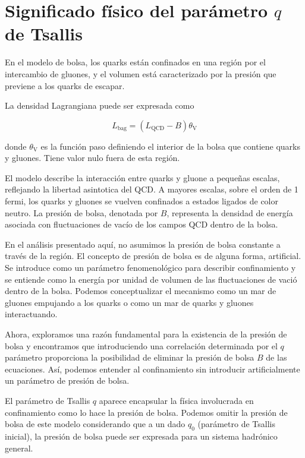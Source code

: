 \chapter{Significado físico del parámetro $q$ de Tsallis}


En el modelo de bolsa, los quarks están confinados en una región por el intercambio de gluones, y el volumen está caracterizado por la presión que previene a los quarks de escapar.

La densidad Lagrangiana puede ser expresada como

\begin{equation}
{L}_{\mathrm{bag}} = \left({L}_{\mathrm{QCD}} - B\right){\theta}_{\mathrm{V}}
\end{equation}

donde ${\theta}_{\mathrm{V}}$ es la función paso definiendo el interior de la bolsa que contiene quarks y gluones. Tiene valor nulo fuera de esta región.

El modelo describe la interacción entre quarks y gluone a pequeñas escalas, reflejando la libertad asintotica del QCD. A mayores escalas, sobre el orden de 1 fermi, los quarks y gluones se vuelven confinados a estados ligados de color neutro. La presión de bolsa, denotada por $B$, representa la densidad de energía asociada con fluctuaciones de vacío de los campos QCD dentro de la bolsa.

En el análisis presentado aquí, no asumimos la presión de bolsa constante a través de la región. El concepto de presión de bolsa es de alguna forma, artificial. Se introduce como un parámetro fenomenológico para describir confinamiento y se entiende como la energía por unidad de volumen de las fluctuaciones de vació dentro de la bolsa. Podemos conceptualizar el mecanismo como un mar de gluones empujando a los quarks o como un mar de quarks y gluones interactuando.

Ahora, exploramos una razón fundamental para la existencia de la presión de bolsa y encontramos que introduciendo una correlación determinada por el $q$ parámetro proporciona la posibilidad de eliminar la presión de bolsa $B$ de las ecuaciones. Así, podemos entender al confinamiento sin introducir artificialmente un parámetro de presión de bolsa.

El parámetro de Tsallis $q$ aparece encapsular la física involucrada en confinamiento como lo hace la presión de bolsa. Podemos omitir la presión de bolsa de este modelo considerando que a un dado ${q}_{0}$ (parámetro de Tsallis inicial), la presión de bolsa puede ser expresada para un sistema hadrónico general.

